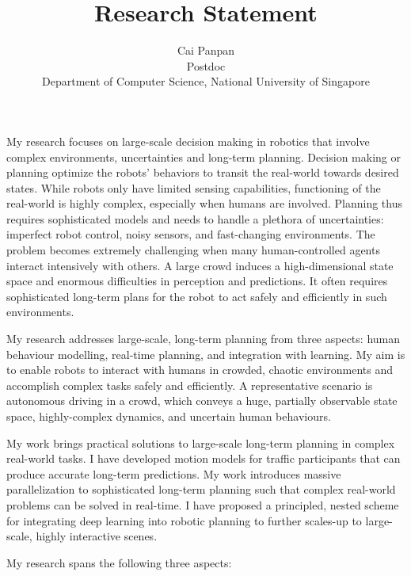 \documentclass{article}
\title{Research Statement}
\author{%
  Cai Panpan \\
  Postdoc \\
  Department of Computer Science, 
  National University of Singapore \\
}
\begin{document}
\maketitle
My research focuses on large-scale decision making in robotics that involve complex environments, uncertainties and long-term planning. Decision making or planning optimize the robots’ behaviors to transit the real-world towards desired states. While robots only have limited sensing capabilities, functioning of the real-world is highly complex, especially when humans are involved. Planning thus requires sophisticated models and needs to handle a plethora of uncertainties: imperfect robot control, noisy sensors, and fast-changing environments. The problem becomes extremely challenging when many human-controlled agents interact intensively with others. A large crowd induces a high-dimensional state space and enormous difficulties in perception and predictions. It often requires sophisticated long-term plans for the robot to act safely and efficiently in such environments.

My research addresses large-scale, long-term planning from three aspects: human behaviour modelling, real-time planning, and integration with learning. My aim is to enable robots to interact with humans in crowded, chaotic environments and accomplish complex tasks safely and efficiently. A representative scenario is autonomous driving in a crowd, which conveys a huge, partially observable state space, highly-complex dynamics, and uncertain human behaviours.

My work brings practical solutions to large-scale long-term planning in complex real-world tasks. I have developed motion models for traffic participants that can produce accurate long-term predictions. My work introduces massive parallelization to sophisticated long-term planning such that complex real-world problems can be solved in real-time. I have proposed a principled, nested scheme for integrating deep learning into robotic planning to further scales-up to large-scale, highly interactive scenes.

My research spans the following three aspects:
\end{document}
